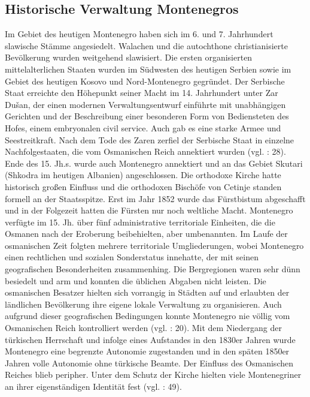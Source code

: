 \subsection{Historische Verwaltung Montenegros }

Im Gebiet des heutigen Montenegro haben sich im 6. und 7. Jahrhundert slawische Stämme angesiedelt. Walachen und die autochthone christianisierte Bevölkerung wurden weitgehend slawisiert. Die ersten organisierten mittelalterlichen Staaten wurden im Südwesten des heutigen Serbien sowie im Gebiet des heutigen Kosovo und Nord-Montenegro gegründet. Der Serbische Staat erreichte den Höhepunkt seiner Macht im 14. Jahrhundert unter Zar Dušan, der einen modernen Verwaltungsentwurf einführte mit unabhängigen Gerichten und der Beschreibung einer besonderen Form von Bediensteten des Hofes, einem embryonalen civil service. Auch gab es eine starke Armee und Seestreitkraft. Nach dem Tode des Zaren zerfiel der Serbische Staat in einzelne Nachfolgestaaten, die vom Osmanischen Reich annektiert wurden (vgl. \cite{beckm90}: 28). Ende des 15. Jh.s. wurde auch Montenegro annektiert und an das Gebiet Skutari (Shkodra im heutigen Albanien) angeschlossen. Die orthodoxe Kirche hatte historisch großen Einfluss und die orthodoxen Bischöfe von Cetinje standen formell an der Staatsspitze. Erst im Jahr 1852 wurde das Fürstbistum abgeschafft und in der Folgezeit hatten die Fürsten nur noch weltliche Macht. Montenegro verfügte im 15. Jh. über fünf administrative territoriale Einheiten, die die Osmanen nach der Eroberung beibehielten, aber umbenannten. Im Laufe der osmanischen Zeit folgten mehrere territoriale Umgliederungen, wobei Montenegro einen rechtlichen und sozialen Sonderstatus innehatte, der mit seinen geografischen Besonderheiten zusammenhing. Die Bergregionen waren sehr dünn besiedelt und arm und konnten die üblichen Abgaben nicht leisten. Die osmanischen Besatzer hielten sich vorrangig in Städten auf und erlaubten der ländlichen Bevölkerung ihre eigene lokale Verwaltung zu organisieren. Auch aufgrund dieser geografischen Bedingungen konnte Montenegro nie völlig vom Osmanischen Reich kontrolliert werden (vgl. \cite{boeck}: 20). Mit dem Niedergang der türkischen Herrschaft und infolge eines Aufstandes in den 1830er Jahren wurde Montenegro eine begrenzte Autonomie zugestanden und in den späten 1850er Jahren volle Autonomie ohne türkische Beamte. Der Einfluss des Osmanischen Reiches blieb peripher. Unter dem Schutz der Kirche hielten viele Montenegriner an ihrer eigenständigen Identität fest (vgl. \cite{sevic}: 49).\par

